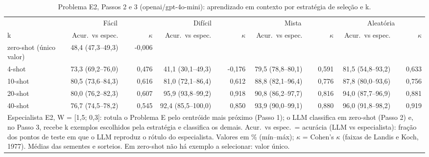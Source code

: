 \begin{table}[htbp]
\centering
\small
\caption{Problema E2, Passos 2 e 3 (openai/gpt-4o-mini): aprendizado em contexto por estratégia de seleção e k.}
\label{tab:bloco2_E2_passo3_estrategia_x_k_gpt4mini}
\begin{tabular}{lrrrrrrrr}
\toprule
 & \multicolumn{2}{c}{Fácil} & \multicolumn{2}{c}{Difícil} & \multicolumn{2}{c}{Mista} & \multicolumn{2}{c}{Aleatória} \\ \cmidrule(lr){2-3} \cmidrule(lr){4-5} \cmidrule(lr){6-7} \cmidrule(lr){8-9}
k & Acur.\ vs espec. & $\kappa$ & Acur.\ vs espec. & $\kappa$ & Acur.\ vs espec. & $\kappa$ & Acur.\ vs espec. & $\kappa$ \\
\midrule
zero-shot (único valor) & 48,4 (47,3–49,3) & -0,006 &  &  &  &  &  &  \\
4-shot & 73,3 (69,2–76,0) & 0,476 & 41,1 (30,1–49,3) & -0,176 & 79,5 (78,8–80,1) & 0,591 & 81,5 (54,8–93,2) & 0,633 \\
10-shot & 80,5 (73,6–84,3) & 0,616 & 81,0 (72,1–86,4) & 0,612 & 88,8 (82,1–96,4) & 0,776 & 87,8 (80,0–93,6) & 0,756 \\
20-shot & 80,0 (76,2–82,3) & 0,607 & 95,9 (93,8–99,2) & 0,918 & 90,8 (86,2–97,7) & 0,816 & 94,0 (87,7–96,9) & 0,881 \\
40-shot & 76,7 (74,5–78,2) & 0,545 & 92,4 (85,5–100,0) & 0,850 & 93,9 (90,0–99,1) & 0,880 & 96,0 (91,8–98,2) & 0,919 \\
\bottomrule
\multicolumn{9}{p{0.95\linewidth}}{\footnotesize Especialista E2, W = [1,5; 0,3]: rotula o Problema E pelo centróide mais próximo (Passo 1); o LLM classifica em zero-shot (Passo 2) e, no Passo 3, recebe k exemplos escolhidos pela estratégia e classifica os demais. Acur.\ vs espec.\ = acurácia (LLM vs especialista): fração dos pontos de teste em que o LLM reproduz o rótulo do especialista. Valores em \% (mín–máx); $\kappa$ = Cohen's $\kappa$ (faixas de Landis e Koch, 1977). Médias das sementes e sorteios. Em zero-shot não há exemplo a selecionar: valor único.} \\
\end{tabular}
\end{table}
